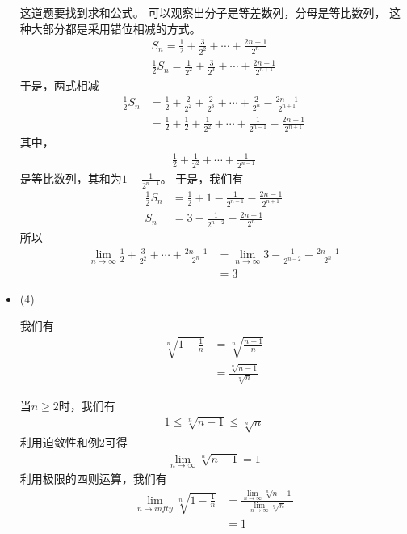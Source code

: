 \documentclass{article}
\begin{document}
\begin{itemize}
        这道题要找到求和公式。
        可以观察出分子是等差数列，分母是等比数列，
        这种大部分都是采用错位相减的方式。
        \begin{align*}
          S_n = \frac{1}{2} + \frac{3}{2^2} + \cdots + \frac{2n - 1}{2^n} \\
          \frac{1}{2}S_n = \frac{1}{2^2} + \frac{3}{2^3} + \cdots + \frac{2n - 1}{2^{n+1}}
        \end{align*}
        于是，两式相减
        \begin{align*}
          \frac{1}{2}S_n
           & = \frac{1}{2} + \frac{2}{2^2} + \frac{2}{2^3} + \cdots + \frac{2}{2^n} - \frac{2n - 1}{2^{n+1}}    \\
           & = \frac{1}{2} + \frac{1}{2}+ \frac{1}{2^2} + \cdots + \frac{1}{2^{n - 1}} - \frac{2n - 1}{2^{n+1}}
        \end{align*}
        其中，
        \begin{align*}
          \frac{1}{2}+ \frac{1}{2^2} + \cdots + \frac{1}{2^{n - 1}}
        \end{align*}
        是等比数列，其和为$1 - \frac{1}{2^{n - 1}}$。
        于是，我们有
        \begin{align*}
          \frac{1}{2}S_n & = \frac{1}{2} + 1 - \frac{1}{2^{n - 1}} - \frac{2n - 1}{2^{n+1}} \\
          S_n            & = 3 - \frac{1}{2^{n - 2}} - \frac{2n - 1}{2^{n}}
        \end{align*}
        所以
        \begin{align*}
          \lim\limits_{n \to \infty} \frac{1}{2} + \frac{3}{2^2} + \cdots + \frac{2n - 1}{2^n}
           & = \lim\limits_{n \to \infty} 3 - \frac{1}{2^{n - 2}} - \frac{2n - 1}{2^{n}} \\
           & = 3
        \end{align*}

  \item (4)

        我们有
        \begin{align*}
          \sqrt[n]{1 - \frac{1}{n}}
           & = \sqrt[n]{\frac{n - 1}{n}}           \\
           & = \frac{\sqrt[n]{n - 1}}{\sqrt[n]{n}}
        \end{align*}

        当$n \geq 2$时，我们有
        \begin{align*}
          1 \leq \sqrt[n]{n - 1} \leq \sqrt[n]{n}
        \end{align*}
        利用迫敛性和例2可得
        \begin{align*}
          \lim\limits_{n \to \infty} \sqrt[n]{n - 1} = 1
        \end{align*}
        利用极限的四则运算，我们有
        \begin{align*}
          \lim\limits_{n \to infty} \sqrt[n]{1 - \frac{1}{n}}
           & = \frac{\lim\limits_{n \to \infty} \sqrt[n]{n - 1}}{\lim\limits_{n \to \infty} \sqrt[n]{n}} \\
           & = 1
        \end{align*}


\end{itemize}
\end{document}
